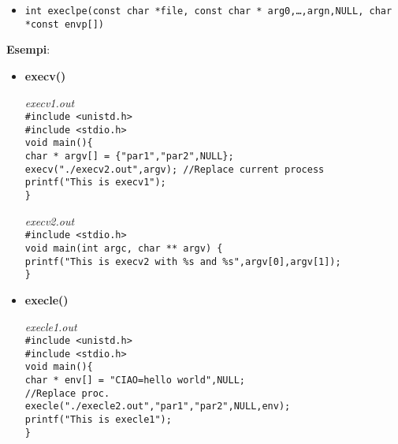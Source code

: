 \begin{flushleft}
\begin{flushleft}
\begin{flushleft}
\begin{itemize}
        \item \texttt{int execlpe(const char *file, const char * arg0,…,argn,NULL, 
                      char *const envp[])}
      \end{itemize}
      \textbf{Esempi}:
      \begin{flushleft}
        \begin{itemize}
          \item \textbf{execv()}\par 
                \textit{execv1.out} \\
                \texttt{\#include <unistd.h>\\
                        \#include <stdio.h>\\
                        void main()\{ \\
                        \halftab char * argv[] = \{"par1","par2",NULL\};\\
                        \halftab execv("./execv2.out",argv); //Replace current process \\
                        \halftab printf("This is execv1\n"); \\
                        \}}\par 
                \textit{execv2.out} \\
                \texttt{\#include <stdio.h> \\
                        void main(int argc, char ** argv) \{ \\
                        \halftab printf("This is execv2 with \%s and \%s\n",argv[0],argv[1]);\\  
                        \} }
          \item \textbf{execle()} \par 
                \textit{execle1.out} \\
                \texttt{\#include <unistd.h>\\
                        \#include <stdio.h> \\
                        void main()\{ \\
                        \halftab char * env[] = {"CIAO=hello world",NULL};\\
                        \halftab //Replace proc.\\
                        \halftab execle("./execle2.out","par1","par2",NULL,env); \\ 
                        \halftab printf("This is execle1\n"); \\
                        \}} \par 

\end{itemize}
\end{flushleft}
\end{flushleft}
\end{flushleft}
\end{flushleft}
